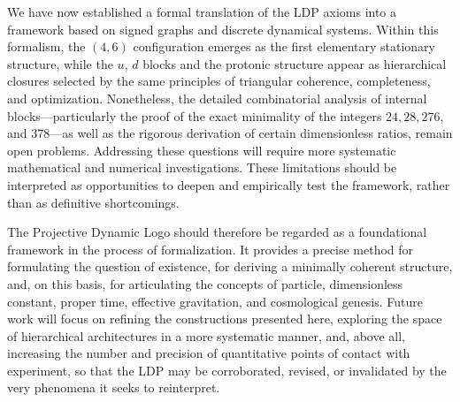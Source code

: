 \documentclass[11pt,a4paper]{article}
\begin{document}
We have now established a formal translation of the LDP axioms into a framework based on signed graphs and discrete dynamical systems. Within this formalism, the \((4,6)\) configuration emerges as the first elementary stationary structure, while the \(u\), \(d\) blocks and the protonic structure appear as hierarchical closures selected by the same principles of triangular coherence, completeness, and optimization. Nonetheless, the detailed combinatorial analysis of internal blocks—particularly the proof of the exact minimality of the integers \(24, 28, 276,\) and \(378\)—as well as the rigorous derivation of certain dimensionless ratios, remain open problems. Addressing these questions will require more systematic mathematical and numerical investigations. These limitations should be interpreted as opportunities to deepen and empirically test the framework, rather than as definitive shortcomings.

The Projective Dynamic Logo should therefore be regarded as a foundational framework in the process of formalization. It provides a precise method for formulating the question of existence, for deriving a minimally coherent structure, and, on this basis, for articulating the concepts of particle, dimensionless constant, proper time, effective gravitation, and cosmological genesis. Future work will focus on refining the constructions presented here, exploring the space of hierarchical architectures in a more systematic manner, and, above all, increasing the number and precision of quantitative points of contact with experiment, so that the LDP may be corroborated, revised, or invalidated by the very phenomena it seeks to reinterpret.
\end{document}
